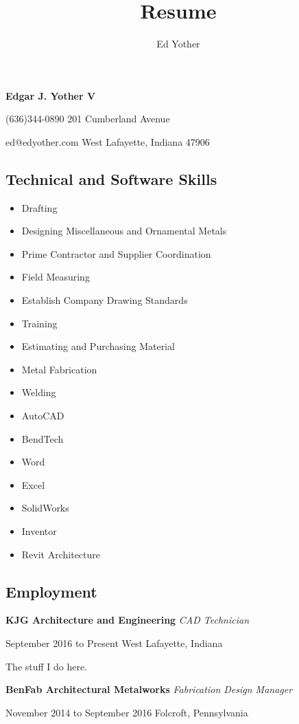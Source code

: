 \documentclass[9pt]{extarticle}
\title{Resume}
\author{Ed Yother}
\begin{document}
\begin{center}
    \textbf{Edgar J. Yother V}
\end{center}
(636)344-0890 \hfill 201 Cumberland Avenue 

ed@edyother.com \hfill West Lafayette, Indiana 47906 


\subsection*{Technical and Software Skills}
\begin{itemize}
    \item Drafting
    \item Designing Miscellaneous and Ornamental Metals 
    \item Prime Contractor and Supplier Coordination  
    \item Field Measuring  
    \item Establish Company Drawing Standards  
    \item Training  
    \item Estimating and Purchasing Material  
    \item Metal Fabrication  
    \item Welding  
    \item AutoCAD  
    \item BendTech  
    \item Word  
    \item Excel  
    \item SolidWorks  
    \item Inventor  
    \item Revit Architecture
\end{itemize}
\subsection*{Employment}

\textbf{KJG Architecture and Engineering} \hfill \textit{CAD Technician}

September 2016 to Present \hfill West Lafayette, Indiana

\hfill

The stuff I do here. 

\hfill

\textbf{BenFab Architectural Metalworks} \hfill \textit{Fabrication Design Manager}

November 2014 to September 2016 \hfill Folcroft, Pennsylvania

\hfill
\end{document}
